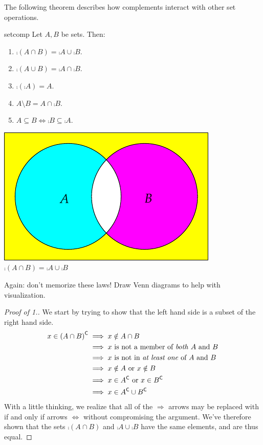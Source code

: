The following theorem describes how complements interact with other set operations.\par


\begin{minipage}[t]{0.62\linewidth}\vspace{0pt}
\begin{thm}{}{setcomp}
Let $A,B$ be sets. Then:
\begin{enumerate}\setlength{\itemsep}{0pt}
\item $\comp{(A\cap B)}=\comp A\cup \comp B$.
\item $\comp{(A\cup B)}=\comp A\cap \comp B$.
\item $\comp{(\comp A)}=A$.
\item $A\setminus B=A\cap\comp B$.
\item $A\subseteq B\iff \comp B\subseteq \comp A$.
\end{enumerate}
\end{thm}
\end{minipage}\qquad
\begin{minipage}{0.33\linewidth}\vspace{0pt}
\centering
\includegraphics[scale=1]{sets-08-venndemorgan}\\
$\comp{(A\cap B)}=\comp A\cup \comp B$
\end{minipage}\medbreak

Again: don't memorize these laws! Draw Venn diagrams to help with visualization. 

\begin{proof}[Proof of 1.]
We start by trying to show that the left hand side is a subset of the right hand side.
\begin{align*}
x\in{(A\cap B)}^{\mathsf{C}}&\implies x\notin A\cap B\\
&\implies x\text{ is not a member of \emph{both} $A$ and $B$}\\
&\implies x\text{ is not in \emph{at least one} of $A$ and $B$}\\
&\implies x\notin A\text{ or }x\notin B\\
&\implies x\in{A}^{\mathsf{C}}\text{ or }x\in{B}^{\mathsf{C}}\\
&\implies x\in{A}^{\mathsf{C}}\cup{B}^{\mathsf{C}}
\end{align*}
With a little thinking, we realize that all of the $\Longrightarrow$ arrows may be replaced with if and only if arrows $\Longleftrightarrow$ without compromising the argument. We've therefore shown that the sets $\comp{(A\cap B)}$ and $\comp A\cup \comp B$ have the same elements, and are thus equal.
\end{proof}

